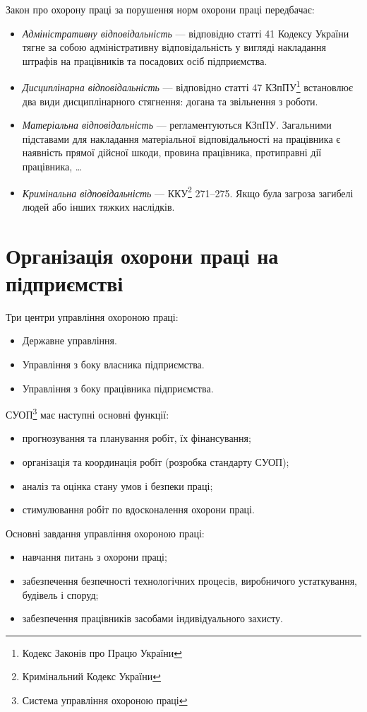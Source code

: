 \documentclass[a5paper,10pt,notitlepage,pdftex,headsepline]{scrartcl}
\begin{document}
  Закон про охорону праці за порушення норм охорони праці передбачає:
  \begin{itemize}
    \item \emph{Адміністративну відповідальність} --- відповідно статті 41
      Кодексу України тягне за собою адміністративну відповідальність у
      вигляді накладання штрафів на працівників та посадових осіб
      підприємства.
    \item \emph{Дисциплінарна відповідальність} --- відповідно статті 47
      КЗпПУ\footnote{Кодекс Законів про Працю України} встановлює два види
      дисциплінарного стягнення: догана та звільнення з роботи.
    \item \emph{Матеріальна відповідальність} --- регламентуються КЗпПУ.
      Загальними підставами для накладання матеріальної відповідальності на
      працівника є наявність прямої дійсної шкоди, провина працівника,
      протиправні дії працівника, \ldots
    \item \emph{Кримінальна відповідальність} --- ККУ\footnote{Кримінальний
      Кодекс України} 271--275.
      Якщо була загроза загибелі людей або інших тяжких наслідків.
  \end{itemize}

\section{Організація охорони праці на підприємстві}
  Три центри управління охороною праці:
  \begin{itemize}
    \item Державне управління.
    \item Управління з боку власника підприємства.
    \item Управління з боку працівника підприємства.
  \end{itemize}

  СУОП\footnote{Система управління охороною праці} має наступні основні
  функції:
  \begin{itemize}
    \item прогнозування та планування робіт, їх фінансування;
    \item організація та координація робіт (розробка стандарту СУОП);
    \item аналіз та оцінка стану умов і безпеки праці;
    \item стимулювання робіт по вдосконалення охорони праці.
  \end{itemize}

  Основні завдання управління охороною праці:
  \begin{itemize}
    \item навчання питань з охорони праці;
    \item забезпечення безпечності технологічних процесів, виробничого
      устаткування, будівель і споруд;
    \item забезпечення працівників засобами індивідуального захисту.
  \end{itemize}
\end{document}
